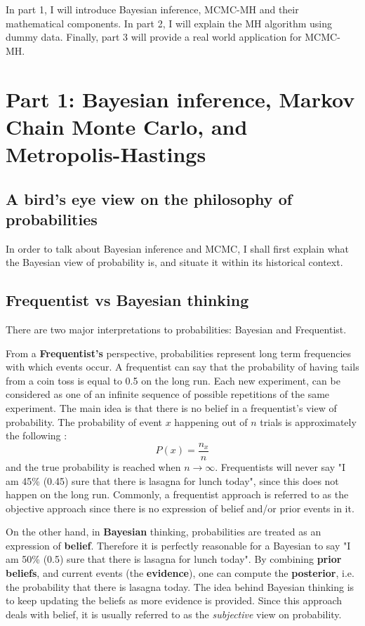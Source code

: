 In part 1, I will introduce Bayesian inference, MCMC-MH and their mathematical components. In part 2, I will explain the MH algorithm using dummy data. Finally, part 3 will provide a real world application for MCMC-MH.

\section{Part 1: Bayesian inference, Markov Chain Monte Carlo, and Metropolis-Hastings}

\subsection{A bird's eye view on the philosophy of probabilities}
In order to talk about Bayesian inference and MCMC, I shall first explain what the Bayesian view of probability is, and situate it within its historical context.

\subsection{Frequentist vs Bayesian thinking}
There are two major interpretations to probabilities: Bayesian and Frequentist.

From a \textbf{Frequentist's} perspective, probabilities represent long term frequencies with which events occur. A frequentist can say that the probability of having tails from a coin toss is equal to 0.5 on the long run. Each new experiment, can be considered as one of an infinite sequence of possible repetitions of the same experiment. The main idea is that there is no belief in a frequentist's view of probability. The probability of event $x$ happening out of $n$ trials is approximately the following :
\begin{equation}P(x)=\frac{n_{x}}{n}\end{equation}
and the true probability is reached when $n\rightarrow\infty$. Frequentists will never say "I am 45\% (0.45) sure that there is lasagna for lunch today", since this does not happen on the long run. Commonly, a frequentist approach is referred to as the objective approach since there is no expression of belief and/or prior events in it.

On the other hand, in \textbf{Bayesian} thinking, probabilities are treated as an expression of \textbf{belief}. Therefore it is perfectly reasonable for a Bayesian to say "I am 50\% (0.5) sure that there is lasagna for lunch today". By combining \textbf{prior beliefs}, and current events (the \textbf{evidence}), one can compute the \textbf{posterior}, i.e. the probability that there is lasagna today. The idea behind Bayesian thinking is to keep updating the beliefs as more evidence is provided. Since this approach deals with belief, it is usually referred to as the \textit{subjective} view on probability.

